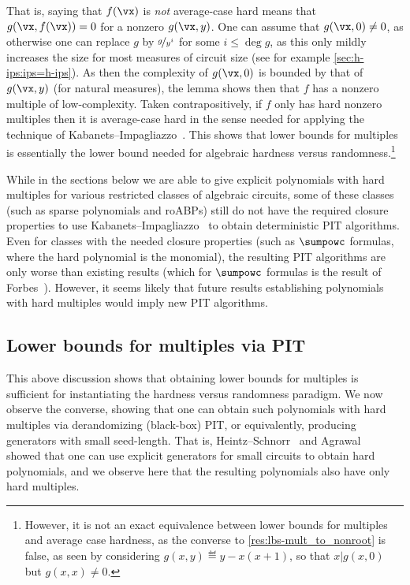 \documentclass[11pt]{article}
\numberwithin{equation}{section}
\theoremstyle{definition}
\theoremstyle{plain}
\begin{document}
That is, saying that $f(\vx)$ is \emph{not} average-case hard means that $g(\vx,f(\vx))=0$ for a nonzero $g(\vx,y)$.  One can assume that $g(\vx,0)\ne 0$, as otherwise one can replace $g$ by $\nicefrac{g}{y^i}$ for some $i\le \deg g$, as this only mildly increases the size for most measures of circuit size (see for example \autoref{sec:h-ips:ips=h-ips}).  As then the complexity of $g(\vx,0)$ is bounded by that of $g(\vx,y)$ (for natural measures), the lemma shows then that $f$ has a nonzero multiple of low-complexity.  Taken contrapositively, if $f$ only has hard nonzero multiples then it is average-case hard in the sense needed for applying the technique of Kabanets--Impagliazzo~\cite{KabanetsImpagliazzo04}. This shows that lower bounds for multiples is essentially the lower bound needed for algebraic hardness versus randomness.\footnote{However, it is not an exact equivalence between lower bounds for multiples and average case hardness, as the converse to \autoref{res:lbs-mult_to_nonroot} is false, as seen by considering $g(x,y)\eqdef y-x(x+1)$, so that $x|g(x,0)$ but $g(x,x)\ne 0$.}

While in the
%
sections below  %
we are able to give explicit polynomials with hard multiples for various restricted classes of algebraic circuits, some of these classes (such as sparse polynomials and roABPs) still do not have the required closure properties to use Kabanets--Impagliazzo~\cite{KabanetsImpagliazzo04} to obtain deterministic PIT algorithms.  Even for classes with the needed closure properties (such as $\sumpowc$ formulas, where the hard polynomial is the monomial), the resulting PIT algorithms are only worse than existing results (which for $\sumpowc$ formulas is the result of Forbes~\cite{Forbes15}).  However, it seems likely that future results establishing polynomials with hard multiples would imply new PIT algorithms.

\subsection{Lower bounds for multiples via PIT}\label{sec:lb-via-pit}

This above discussion shows that obtaining lower bounds for multiples is sufficient for instantiating the hardness versus randomness paradigm.  We now observe the converse, showing that one can obtain such polynomials with hard multiples via derandomizing (black-box) PIT, or equivalently, producing generators with small seed-length.  That is, Heintz--Schnorr~\cite{HeintzSchnorr80} and Agrawal~\cite{Agrawal05} showed that one can use explicit generators for small circuits to obtain hard polynomials, and we observe here that the resulting polynomials also have only hard multiples.
\end{document}
